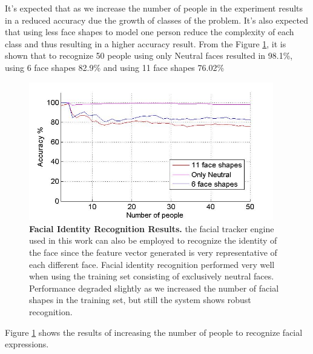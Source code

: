 \documentclass[]{article}
\begin{document}
It's expected that as we increase the number of people in the experiment results
in a reduced accuracy due the growth of classes of the problem. It’s also
expected  that using less face shapes to model one person reduce the complexity
of  each class and thus resulting in a higher accuracy result.
From the Figure \ref{feRecognition}, it is shown that to recognize 50 people
using only Neutral faces resulted in 98.1\%, using 6 face shapes 82.9\% and
using 11 face shapes 76.02\%
 


\begin{figure}[ht]
\begin{center}
\vspace{-3mm}
\includegraphics[width=0.95\textwidth]{figures/peopleRecognition4.jpg}
\end{center}
\caption{\textbf{Facial Identity Recognition Results.} the facial tracker engine used in this work can also be employed 
to recognize the identity of the face since the feature vector generated is very representative  of each different face.
Facial identity recognition performed very well when using the training set consisting of exclusively neutral faces. 
Performance degraded slightly as we increased the number of facial shapes in the training set, but still the system shows 
robust  recognition.}
\label{feRecognition}
\end{figure}

Figure \ref{feRecognition} shows the results of increasing the number of people
to recognize facial expressions.
\end{document}

